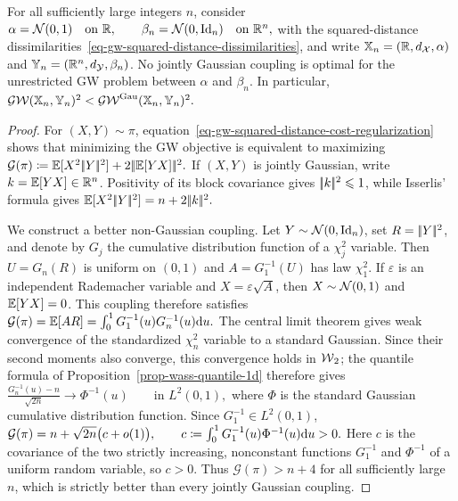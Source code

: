 \begin{prop}\label{prop-gw-gaussian-closure-fails}
For all sufficiently large integers $n$, consider
\(\alpha=\mathcal{N}(0,1)\quad\text{on }\mathbb{R}, \qquad \beta_n=\mathcal{N}(0,\mathrm{Id}_n)\quad\text{on }\mathbb{R}^n,\)
with the squared-distance dissimilarities~\eqref{eq-gw-squared-distance-dissimilarities}, and write $\mathbb{X}_n=(\mathbb{R},d_{\mathcal{X}},\alpha)$ and $\mathbb{Y}_n=(\mathbb{R}^n,d_{\mathcal{Y}},\beta_n)$. No jointly Gaussian coupling is optimal for the unrestricted GW problem between $\alpha$ and $\beta_n$. In particular,
\(\operatorname{\mathcal{GW}}(\mathbb{X}_n,\mathbb{Y}_n)^2<\operatorname{\mathcal{GW}}^{\mathrm{Gau}}(\mathbb{X}_n,\mathbb{Y}_n)^2.\)
\end{prop}
\begin{proof}
For $(X,Y)\sim\pi$, equation~\eqref{eq-gw-squared-distance-cost-regularization} shows that minimizing the GW objective is equivalent to maximizing
\(\mathcal G(\pi) \coloneqq \mathbb{E}[X^2|\!| Y |\!|^2] + 2|\!| \mathbb{E}[YX] |\!|^2.\)
If $(X,Y)$ is jointly Gaussian, write $k=\mathbb{E}[YX]\in\mathbb{R}^n$. Positivity of its block covariance gives $|\!| k |\!|^2\leqslant1$, while Isserlis' formula gives \(\mathbb{E}[X^2|\!| Y |\!|^2]=n+2|\!| k |\!|^2.\)

We construct a better non-Gaussian coupling. Let $Y\sim\mathcal{N}(0,\mathrm{Id}_n)$, set $R=|\!| Y |\!|^2$, and denote by $G_j$ the cumulative distribution function of a $\chi_j^2$ variable. Then $U=G_n(R)$ is uniform on $(0,1)$ and $A=G_1^{-1}(U)$ has law $\chi_1^2$. If $\varepsilon$ is an independent Rademacher variable and $X=\varepsilon\sqrt A$, then $X\sim\mathcal{N}(0,1)$ and $\mathbb{E}[YX]=0$. This coupling therefore satisfies
\(\mathcal G(\pi) = \mathbb{E}[AR] = \int_0^1G_1^{-1}(u)G_n^{-1}(u)\mathrm{d} u.\)
The central limit theorem gives weak convergence of the standardized $\chi_n^2$ variable to a standard Gaussian. Since their second moments also converge, this convergence holds in $\operatorname{\mathcal{W}}_2$; the quantile formula of Proposition~\ref{prop-wass-quantile-1d} therefore gives
\(\frac{G_n^{-1}(u)-n}{\sqrt{2n}} \longrightarrow \Phi^{-1}(u) \qquad\text{in }L^2(0,1),\)
where $\Phi$ is the standard Gaussian cumulative distribution function. Since $G_1^{-1}\in L^2(0,1)$, \(\mathcal G(\pi) = n+\sqrt{2n}\bigl(c+o(1)\bigr), \qquad c\coloneqq\int_0^1G_1^{-1}(u)\Phi^{-1}(u)\mathrm{d} u>0.\)
Here $c$ is the covariance of the two strictly increasing, nonconstant functions $G_1^{-1}$ and $\Phi^{-1}$ of a uniform random variable, so $c>0$. Thus $\mathcal G(\pi)>n+4$ for all sufficiently large $n$, which is strictly better than every jointly Gaussian coupling.
\end{proof}
